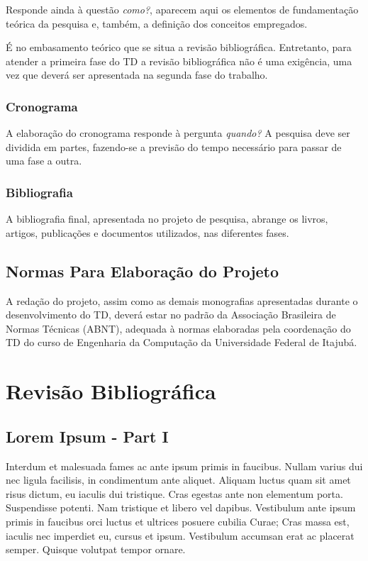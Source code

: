 \documentclass[
	12pt,				%
    oneside,			%
	a4paper,			%
	english,			%
	french,				%
	spanish,			%
	brazil				%
	]{abntex2}
\begin{document}
Responde ainda à questão \emph{como?}, aparecem aqui os elementos
de fundamentação teórica da pesquisa e, também, a definição dos
conceitos empregados.

É no embasamento teórico que se situa a revisão bibliográfica.
Entretanto, para atender a primeira fase do TD a revisão
bibliográfica não é uma exigência, uma vez que deverá ser
apresentada na segunda fase do trabalho.

\subsection{Cronograma}

A elaboração do cronograma responde à pergunta \emph{quando?} A
pesquisa deve ser dividida em partes, fazendo-se a previsão do
tempo necessário para passar de uma fase a outra.

\subsection{Bibliografia}

A bibliografia final, apresentada no projeto de pesquisa, abrange
os livros, artigos, publicações e documentos utilizados, nas
diferentes fases.


\section{Normas Para Elaboração do Projeto}

A redação do projeto, assim como as demais monografias apresentadas
durante o desenvolvimento do TD, deverá estar no padrão da
Associação Brasileira de Normas Técnicas (ABNT), adequada à normas
elaboradas pela coordenação do TD do curso de Engenharia da
Computação da Universidade Federal de Itajubá.

\chapter{Revisão Bibliográfica}

\section{Lorem Ipsum - Part I}

Interdum et malesuada fames ac ante ipsum primis in faucibus. Nullam varius dui nec ligula facilisis, in condimentum ante aliquet. Aliquam luctus quam sit amet risus dictum, eu iaculis dui tristique. Cras egestas ante non elementum porta. Suspendisse potenti. Nam tristique et libero vel dapibus. Vestibulum ante ipsum primis in faucibus orci luctus et ultrices posuere cubilia Curae; Cras massa est, iaculis nec imperdiet eu, cursus et ipsum. Vestibulum accumsan erat ac placerat semper. Quisque volutpat tempor ornare.
\end{document}
